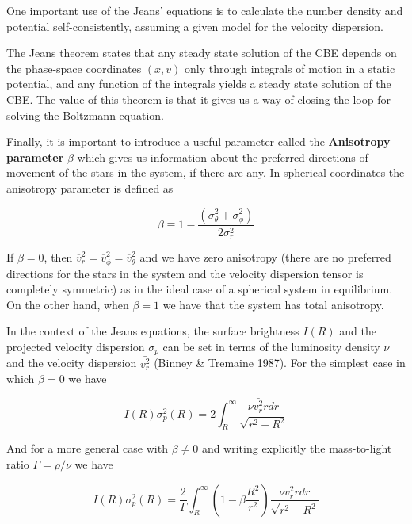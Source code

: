 One important use of the Jeans' equations is to calculate the number density and potential self-consistently, assuming
a given model for the velocity dispersion.

The Jeans theorem states that any steady state solution of the CBE depends on the phase-space coordinates $(x,v)$ only through integrals of motion in a static potential, and any function of the integrals yields a steady state solution of the CBE. The value of this theorem is that it gives us a way of closing the loop for solving the Boltzmann equation. 

Finally, it is important to introduce a useful parameter called the \textbf{Anisotropy parameter} $\beta$ which gives us information about the preferred directions of movement of the stars in the system, if there are any. In spherical coordinates the anisotropy parameter is defined as

\begin{equation}
\beta \equiv 1-\frac{\left(\sigma_{\theta}^{2}+\sigma_{\phi}^{2}\right)}{2\sigma_{r}^{2}}
\end{equation}

If $\beta=0$, then $\overline{v}_{r}^{2}=\overline{v}_{\phi}^{2}=\overline{v}_{\theta}^{2}$ and we have zero anisotropy (there are no preferred directions for the stars in the system and the velocity dispersion tensor is completely symmetric) as in the ideal case of a spherical system in equilibrium. On the other hand, when $\beta=1$ we have that the system has total anisotropy.

In the context of the Jeans equations, the surface brightness $I(R)$ and the projected velocity dispersion $\sigma_{p}$ can be set in terms of the luminosity density $\nu$ and the velocity dispersion $\bar{v_{r}^{2}}$ (Binney \& Tremaine 1987). For the simplest case in which $\beta=0$ we have

\begin{equation}
I(R)\sigma_{p}^{2}(R)=2\int_{R}^{\infty}\frac{\nu\bar{v_{r}^{2}}rdr}{\sqrt{r^{2}-R^{2}}}
\end{equation}     

And for a more general case with $\beta \neq 0$ and writing explicitly the mass-to-light ratio $\Gamma=\rho / \nu$ we have

\begin{equation}
I(R)\sigma_{p}^{2}(R)=\frac{2}{\Gamma}\int_{R}^{\infty}\left(1-\beta\frac{R^{2}}{r^{2}}\right)\frac{\nu\bar{v_{r}^{2}}rdr}{\sqrt{r^{2}-R^{2}}}
\end{equation}

